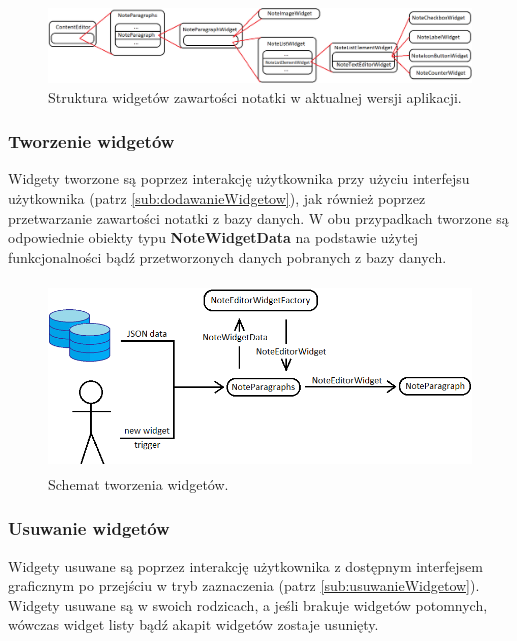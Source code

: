 \begin{figure}[ht]
    \centering
    \includegraphics[width=\linewidth]{images/struktura_widgetow_w_notatce.png}
    \caption{Struktura widgetów zawartości notatki w aktualnej wersji aplikacji.}
    \label{fig:struktura-widgetow}
\end{figure}

\subsubsection{Tworzenie widgetów}

Widgety tworzone są poprzez interakcję użytkownika przy użyciu interfejsu użytkownika (patrz \ref{sub:dodawanieWidgetow}), jak również poprzez przetwarzanie zawartości notatki z bazy danych. W obu przypadkach tworzone są odpowiednie obiekty typu \textbf{NoteWidgetData} na podstawie użytej funkcjonalności bądź przetworzonych danych pobranych z bazy danych.

\begin{figure}[ht]
    \centering
    \includegraphics[height=5cm]{images/tworzenie_widgetow.png}
    \caption{Schemat tworzenia widgetów.}
    \label{fig:create-widget}
\end{figure}

\subsubsection{Usuwanie widgetów}

Widgety usuwane są poprzez interakcję użytkownika z dostępnym interfejsem graficznym po przejściu w tryb zaznaczenia (patrz \ref{sub:usuwanieWidgetow}). Widgety usuwane są w swoich rodzicach, a jeśli brakuje widgetów potomnych, wówczas widget listy bądź akapit widgetów zostaje usunięty.

